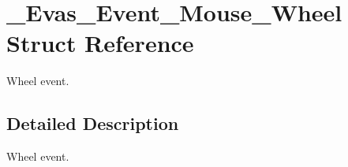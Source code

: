 \section{\_\-Evas\_\-Event\_\-Mouse\_\-Wheel Struct Reference}
\label{struct__Evas__Event__Mouse__Wheel}


Wheel event.  




\subsection{Detailed Description}
Wheel event. 